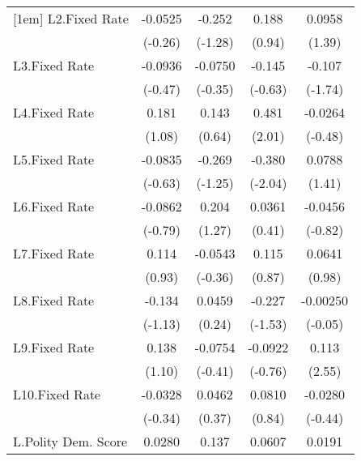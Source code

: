 {\begin{longtable}{l*{4}{c}}
[1em]
L2.Fixed Rate   &  -0.0525         &   -0.252         &    0.188         &   0.0958         \\
                &  (-0.26)         &  (-1.28)         &   (0.94)         &   (1.39)         \\
[1em]
L3.Fixed Rate   &  -0.0936         &  -0.0750         &   -0.145         &   -0.107         \\
                &  (-0.47)         &  (-0.35)         &  (-0.63)         &  (-1.74)         \\
[1em]
L4.Fixed Rate   &    0.181         &    0.143         &    0.481\sym{*}  &  -0.0264         \\
                &   (1.08)         &   (0.64)         &   (2.01)         &  (-0.48)         \\
[1em]
L5.Fixed Rate   &  -0.0835         &   -0.269         &   -0.380\sym{*}  &   0.0788         \\
                &  (-0.63)         &  (-1.25)         &  (-2.04)         &   (1.41)         \\
[1em]
L6.Fixed Rate   &  -0.0862         &    0.204         &   0.0361         &  -0.0456         \\
                &  (-0.79)         &   (1.27)         &   (0.41)         &  (-0.82)         \\
[1em]
L7.Fixed Rate   &    0.114         &  -0.0543         &    0.115         &   0.0641         \\
                &   (0.93)         &  (-0.36)         &   (0.87)         &   (0.98)         \\
[1em]
L8.Fixed Rate   &   -0.134         &   0.0459         &   -0.227         & -0.00250         \\
                &  (-1.13)         &   (0.24)         &  (-1.53)         &  (-0.05)         \\
[1em]
L9.Fixed Rate   &    0.138         &  -0.0754         &  -0.0922         &    0.113\sym{*}  \\
                &   (1.10)         &  (-0.41)         &  (-0.76)         &   (2.55)         \\
[1em]
L10.Fixed Rate  &  -0.0328         &   0.0462         &   0.0810         &  -0.0280         \\
                &  (-0.34)         &   (0.37)         &   (0.84)         &  (-0.44)         \\
[1em]
L.Polity Dem. Score&   0.0280         &    0.137         &   0.0607         &   0.0191         \\

\end{longtable}}
